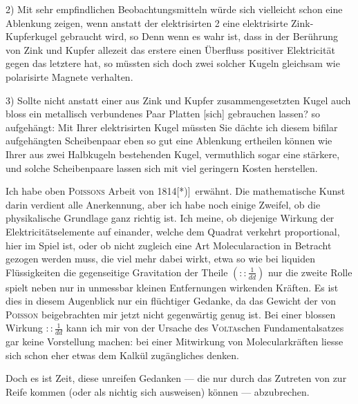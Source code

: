 2) Mit sehr empfindlichen Beobachtungsmitteln würde sich vielleicht schon eine Ablenkung zeigen, wenn anstatt der elektrisirten 2 eine  elektrisirte Zink-Kupferkugel gebraucht wird, so
\EMThreeFigTwo
\noindent\hspace*{\parindent}Denn wenn es wahr ist, dass in der Berührung von Zink und Kupfer allezeit das erstere einen Überfluss positiver Elektricität gegen das letztere hat, so müssten sich doch zwei solcher Kugeln gleichsam wie polarisirte Magnete verhalten.

3) Sollte nicht anstatt einer aus Zink und Kupfer zusammengesetzten Kugel auch bloss ein metallisch verbundenes Paar Platten [sich] gebrauchen lassen? so aufgehängt:
\clearpage{}
\EMThreeFigThree
\noindent\hspace*{\parindent}Mit Ihrer elektrisirten Kugel müssten Sie dächte ich diesem bifilar aufgehängten Scheibenpaar eben so gut eine Ablenkung ertheilen können wie Ihrer aus zwei Halbkugeln bestehenden Kugel, vermuthlich sogar eine stärkere, und solche Scheibenpaare lassen sich mit viel geringern Kosten herstellen.

Ich habe oben \textsc{Poissons} Arbeit von 1814[*)]\begingroup\renewcommand{\thefootnote}{}\endgroup\ erwähnt. Die mathematische Kunst darin verdient alle Anerkennung, aber ich habe noch einige Zweifel, ob die physikalische Grundlage ganz richtig ist. Ich meine, ob diejenige Wirkung der Elektricitätselemente auf einander, welche dem Quadrat verkehrt proportional, hier  im Spiel ist, oder ob nicht zugleich eine Art Molecularaction in Betracht gezogen werden muss, die viel mehr dabei wirkt, etwa so wie bei liquiden Flüssigkeiten die gegenseitige Gravitation der Theile $\left(\mathrel{::}\frac{1}{dd}\right)$ nur die zweite Rolle spielt neben nur in unmessbar kleinen Entfernungen wirkenden Kräften. Es ist dies in diesem Augenblick nur ein flüchtiger Gedanke, da das Gewicht der von \textsc{Poisson} beigebrachten  mir jetzt nicht gegenwärtig genug ist. Bei einer blossen Wirkung $\mathrel{::}\frac{1}{dd}$ kann ich mir von der Ursache des \textsc{Volta}schen Fundamentalsatzes gar keine Vorstellung machen: bei einer Mitwirkung von Molecularkräften liesse sich schon eher etwas dem Kalkül zugängliches denken.

Doch es ist Zeit, diese unreifen Gedanken — die nur durch das Zutreten von  zur Reife kommen (oder als nichtig sich ausweisen) können — abzubrechen.

